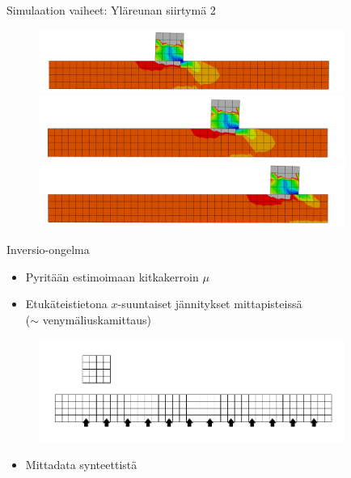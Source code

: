 \documentclass{beamer}
\begin{document}
\begin{frame}{Simulaation vaiheet: Yläreunan siirtymä 2}

\begin{figure}
\includegraphics[width=10cm]{anim3.pdf}\\
\includegraphics[width=10cm]{anim4.pdf}\\
\includegraphics[width=10cm]{anim5.pdf}
\end{figure}

\end{frame}

\begin{frame}{Inversio-ongelma}

\begin{itemize}
\item Pyritään estimoimaan kitkakerroin $\mu$
\item Etukäteistietona $x$-suuntaiset jännitykset mittapisteissä\\($\sim$ venymäliuskamittaus)
\end{itemize}

\begin{figure}
\includegraphics[width=10cm]{fretting_geom_meas.pdf}
\end{figure}

\begin{itemize}
\item Mittadata synteettistä
\end{itemize}

\end{frame}
\end{document}

